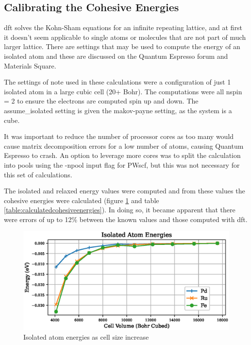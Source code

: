 \subsection{Calibrating the Cohesive Energies}

\acrlong{dft} solves the Kohn-Sham equations for an infinite repeating lattice, and at first it doesn't seem applicable to single atoms or molecules that are not part of much larger lattice.  There are settings that may be used to compute the energy of an isolated atom and these are discussed on the Quantum Espresso forum\cite{qeforum} and Materials Square\cite{materialssquaresingleatom}. 

The settings of note used in these calculations were a configuration of just 1 isolated atom in a large cubic cell (20+ Bohr).  The computations were all nspin = 2 to ensure the electrons are computed spin up and down.  The assume\_isolated setting is given the makov-payne setting, as the system is a cube.

It was important to reduce the number of processor cores as too many would cause matrix decomposition errors for a low number of atoms, causing Quantum Espresso to crash.  An option to leverage more cores was to split the calculation into pools using the -npool input flag for PWscf, but this was not necessary for this set of calculations.


The isolated and relaxed energy values were computed and from these values the cohesive energies were calculated (figure \ref{fig:isolatedatoms} and table \ref{table:calculatedcohesiveenergies}).  In doing so, it became apparent that there were errors of up to 12\% between the known values and those computed with \acrshort{dft}.

\begin{figure}[h]
\begin{center}
\includegraphics[width=0.8\linewidth]{chapters/potentials_fe_pd_ru/isolated/isolated_63.eps}
\caption{Isolated atom energies as cell size increase}
\label{fig:isolatedatoms}
\end{center}
\end{figure}

